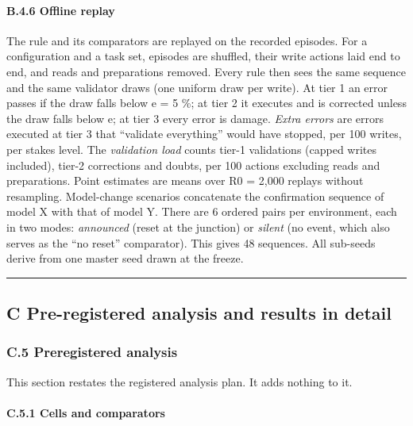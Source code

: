 \paragraph{B.4.6 Offline replay}\label{b.4.6-offline-replay}

The rule and its comparators are replayed on the recorded episodes. For a configuration and a task set, episodes are shuffled, their write actions laid end to end, and reads and preparations removed. Every rule then sees the same sequence and the same validator draws (one uniform draw per write). At tier 1 an error passes if the draw falls below e = 5 \%; at tier 2 it executes and is corrected unless the draw falls below e; at tier 3 every error is damage. \emph{Extra errors} are errors executed at tier 3 that ``validate everything'' would have stopped, per 100 writes, per stakes level. The \emph{validation load} counts tier-1 validations (capped writes included), tier-2 corrections and doubts, per 100 actions excluding reads and preparations. Point estimates are means over R0 = 2,000 replays without resampling. Model-change scenarios concatenate the confirmation sequence of model X with that of model Y. There are 6 ordered pairs per environment, each in two modes: \emph{announced} (reset at the junction) or \emph{silent} (no event, which also serves as the ``no reset'' comparator). This gives 48 sequences. All sub-seeds derive from one master seed drawn at the freeze.

\begin{center}\rule{0.5\linewidth}{0.5pt}\end{center}

\subsection{C Pre-registered analysis and results in detail}\label{c-pre-registered-analysis-and-results-in-detail}

\subsubsection{C.5 Preregistered analysis}\label{c.5-preregistered-analysis}

This section restates the registered analysis plan. It adds nothing to it.

\paragraph{C.5.1 Cells and comparators}\label{c.5.1-cells-and-comparators}

